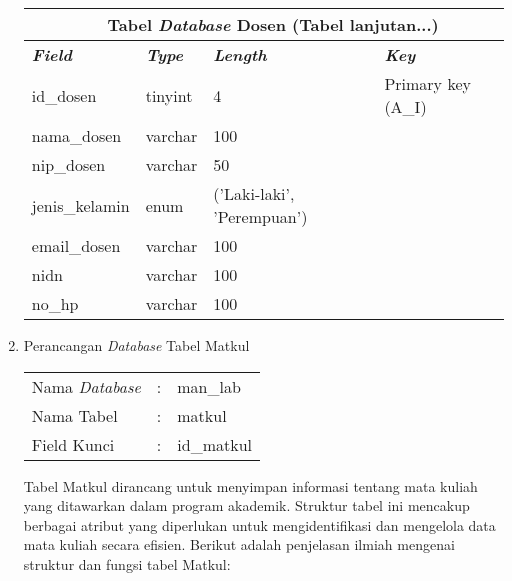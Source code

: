 \begin{enumerate}
{\begin{longtable}{l l l l}
				      \multicolumn{4}{c}{\tablename\ \thetable\ {Tabel \textit{\textit{Database}} Dosen} \space (Tabel lanjutan...)} \\
				      \hline
				      \textbf{\textit{Field}} & \textbf{\textit{Type}} & \textbf{\textit{Length}}   & \textbf{\textit{Key}}          \\
				      \hline
				      \endhead

				      id\_dosen               & tinyint                & 4                          & Primary key (A\_I)             \\
				      nama\_dosen             & varchar                & 100                        &                                \\
				      nip\_dosen              & varchar                & 50                         &                                \\
				      jenis\_kelamin          & enum                   & ('Laki-laki', 'Perempuan') &                                \\
				      email\_dosen            & varchar                & 100                        &                                \\
				      nidn                    & varchar                & 100                        &                                \\
				      no\_hp                  & varchar                & 100                        &                                \\
				      \hline
			      \end{longtable}
		      }

	\item Perancangan \textit{Database} Tabel Matkul \\
	      \begin{tabular}{lll}
		      Nama \textit{Database} & : & man\_lab   \\
		      Nama Tabel             & : & matkul     \\
		      Field Kunci            & : & id\_matkul \\
	      \end{tabular}

	      Tabel Matkul dirancang untuk menyimpan informasi tentang mata kuliah yang ditawarkan dalam program akademik. Struktur tabel ini mencakup berbagai atribut yang diperlukan untuk mengidentifikasi dan mengelola data mata kuliah secara efisien. Berikut adalah penjelasan ilmiah mengenai struktur dan fungsi tabel Matkul:


\end{enumerate}

